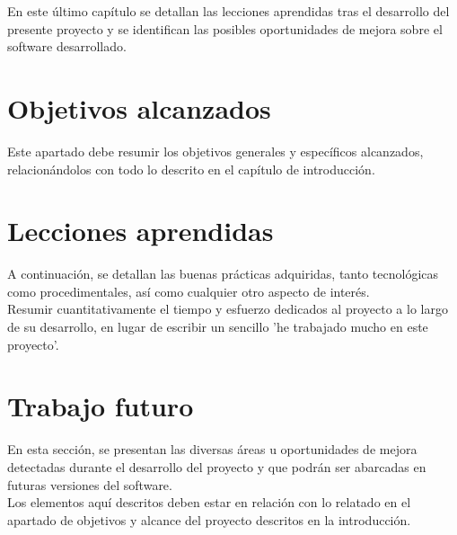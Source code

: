 En este último capítulo se detallan las lecciones aprendidas tras el desarrollo del presente proyecto y se identifican las posibles oportunidades de mejora sobre el software desarrollado.

\section{Objetivos alcanzados}
Este apartado debe resumir los objetivos generales y específicos alcanzados, relacionándolos con todo lo descrito en el capítulo de introducción.\\

\section{Lecciones aprendidas}
A continuación, se detallan las buenas prácticas adquiridas, tanto tecnológicas como procedimentales, así como cualquier otro aspecto de interés.\\
Resumir cuantitativamente el tiempo y esfuerzo dedicados al proyecto a lo largo de su desarrollo, en lugar de escribir un sencillo 'he trabajado mucho en este proyecto'.

\section{Trabajo futuro}
En esta sección, se presentan las diversas áreas u oportunidades de mejora detectadas durante el desarrollo del proyecto y que podrán ser abarcadas en futuras versiones del software.\\

Los elementos aquí descritos deben estar en relación con lo relatado en el apartado de objetivos y alcance del proyecto descritos en la introducción.

